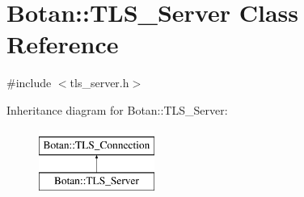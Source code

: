 \hypertarget{classBotan_1_1TLS__Server}{\section{Botan\-:\-:T\-L\-S\-\_\-\-Server Class Reference}
\label{classBotan_1_1TLS__Server}
}


{\ttfamily \#include $<$tls\-\_\-server.\-h$>$}

Inheritance diagram for Botan\-:\-:T\-L\-S\-\_\-\-Server\-:\begin{figure}[H]
\begin{center}
\leavevmode
\includegraphics[height=2.000000cm]{classBotan_1_1TLS__Server}
\end{center}
\end{figure}
